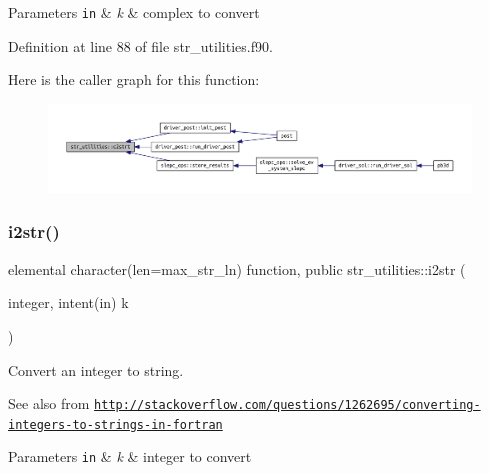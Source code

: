 \begin{DoxyParams}[1]{Parameters}
\mbox{\tt in}  & {\em k} & complex to convert \\
\hline
\end{DoxyParams}


Definition at line 88 of file str\+\_\+utilities.\+f90.

Here is the caller graph for this function\+:\nopagebreak
\begin{figure}[H]
\begin{center}
\leavevmode
\includegraphics[width=350pt]{namespacestr__utilities_abca28d6272d447dc1c0c100624c6ed75_icgraph}
\end{center}
\end{figure}
\mbox{\label{namespacestr__utilities_a0b97e51770725a3e98ed393d26681414}} 
\subsubsection{\texorpdfstring{i2str()}{i2str()}}
{\footnotesize\ttfamily elemental character(len=max\+\_\+str\+\_\+ln) function, public str\+\_\+utilities\+::i2str (\begin{DoxyParamCaption}\item[{integer, intent(in)}]{k }\end{DoxyParamCaption})}



Convert an integer to string. 

\begin{DoxySeeAlso}{See also}
from \href{http://stackoverflow.com/questions/1262695/converting-integers-to-strings-in-fortran}{\tt http\+://stackoverflow.\+com/questions/1262695/converting-\/integers-\/to-\/strings-\/in-\/fortran}
\end{DoxySeeAlso}

\begin{DoxyParams}[1]{Parameters}
\mbox{\tt in}  & {\em k} & integer to convert \\
\hline
\end{DoxyParams}


